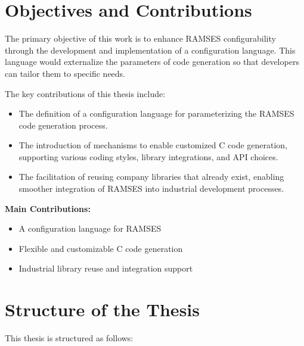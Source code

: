 \section{Objectives and Contributions}

The primary objective of this work is to enhance RAMSES configurability through the development and implementation of a configuration language. This language would externalize the parameters of code generation so that developers can tailor them to specific needs.

The key contributions of this thesis include:
\begin{itemize}
	\item The definition of a configuration language for parameterizing the RAMSES code generation process.
	\item The introduction of mechanisms to enable customized C code generation, supporting various coding styles, library integrations, and API choices.
	\item The facilitation of reusing company libraries that already exist, enabling smoother integration of RAMSES into industrial development processes.
\end{itemize}

\begin{tcolorbox}[colback=blue!5]
	\textbf{Main Contributions:}
	\begin{itemize}
		\item A configuration language for RAMSES
		\item Flexible and customizable C code generation
		\item Industrial library reuse and integration support
	\end{itemize}
\end{tcolorbox}



\section{Structure of the Thesis}

This thesis is structured as follows:

